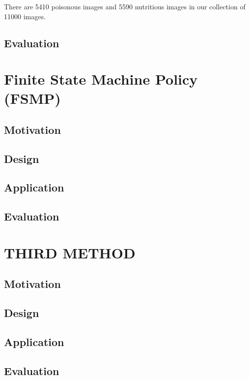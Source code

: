\documentclass[solution, letterpaper]{cs121}
\begin{document}
There are 5410 poisonous images and 5590 nutritious images in our collection of 11000 images.

\subsection{Evaluation}

\section{Finite State Machine Policy (FSMP)}
\subsection{Motivation}
\subsection{Design}
\subsection{Application}
\subsection{Evaluation}

\section{THIRD METHOD}
\subsection{Motivation}
\subsection{Design}
\subsection{Application}
\subsection{Evaluation}
\end{document}
